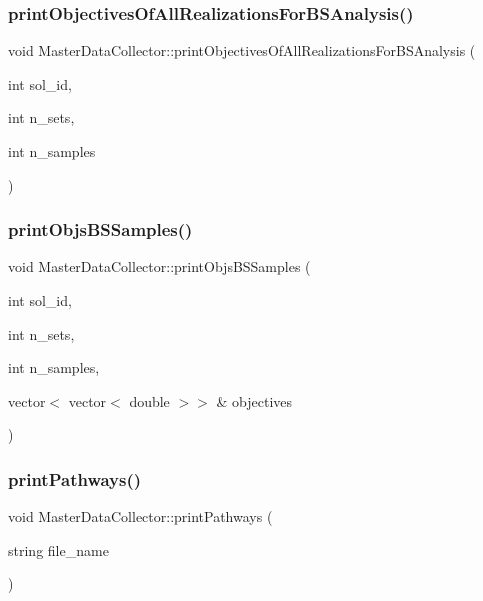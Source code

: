 \subsubsection{\texorpdfstring{print\+Objectives\+Of\+All\+Realizations\+For\+B\+S\+Analysis()}{printObjectivesOfAllRealizationsForBSAnalysis()}}
{\footnotesize\ttfamily void Master\+Data\+Collector\+::print\+Objectives\+Of\+All\+Realizations\+For\+B\+S\+Analysis (\begin{DoxyParamCaption}\item[{int}]{sol\+\_\+id,  }\item[{int}]{n\+\_\+sets,  }\item[{int}]{n\+\_\+samples }\end{DoxyParamCaption})}

\mbox{\label{classMasterDataCollector_a0832afc87f9da7f7b1a70866e4ee4c6d}} 
\subsubsection{\texorpdfstring{print\+Objs\+B\+S\+Samples()}{printObjsBSSamples()}}
{\footnotesize\ttfamily void Master\+Data\+Collector\+::print\+Objs\+B\+S\+Samples (\begin{DoxyParamCaption}\item[{int}]{sol\+\_\+id,  }\item[{int}]{n\+\_\+sets,  }\item[{int}]{n\+\_\+samples,  }\item[{vector$<$ vector$<$ double $>$$>$ \&}]{objectives }\end{DoxyParamCaption})}

\mbox{\label{classMasterDataCollector_a966681d5219d11d0c6882522cd2ddd20}} 
\subsubsection{\texorpdfstring{print\+Pathways()}{printPathways()}}
{\footnotesize\ttfamily void Master\+Data\+Collector\+::print\+Pathways (\begin{DoxyParamCaption}\item[{string}]{file\+\_\+name }\end{DoxyParamCaption})}

